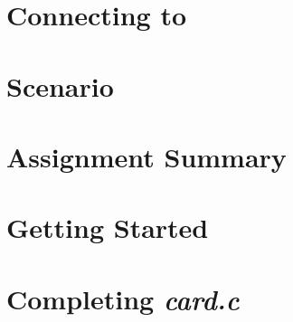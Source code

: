 




\renewcommand{\labnumber}{\pokerlabnumber}
\renewcommand{\labname}{C Programming Familiarization Lab}
\renewcommand{\shortlabname}{pokerlab}
\renewcommand{\collaborationrules}{\pokerlabcollaboration}
\renewcommand{\duedate}{\pokerlabdue}
\pagelayout

\labidentifier


\section{Connecting to \runtimeenvironment} \label{sec:connecting}  

\softwareengineeringfrontmatter

\section*{Scenario}                                                 \MeetArchie

\section{Assignment Summary}                                        

\section{Getting Started} \label{sec:gettingstarted}                

\section{Completing \textit{card.c}} \label{sec:completingcard}     

